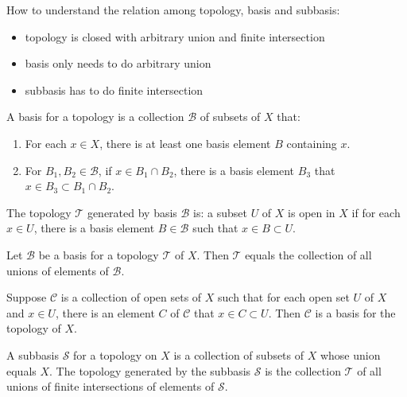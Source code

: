 How to understand the relation among topology, basis and subbasis:
\begin{itemize}
    \item topology is closed with arbitrary union and finite intersection
    \item basis only needs to do arbitrary union
    \item subbasis has to do finite intersection
\end{itemize}



\begin{definition}
    A basis for a topology is a collection $\mathcal{B}$ of subsets of $X$ that:
    \begin{enumerate}
        \item For each $x \in X$, there is at least one basis element $B$ containing $x$.
        \item For $B_1, B_2 \in \mathcal{B}$, if $x \in B_1 \cap B_2$, there is a basis element $B_3$ that $x \in B_3 \subset B_1 \cap B_2$.
    \end{enumerate}
\end{definition}

The topology $\mathcal{T}$ generated by basis $\mathcal{B}$ is: a subset $U$ of $X$ is open in $X$ if for each $x \in U$, there is a basis element $B \in \mathcal{B}$ such that $x \in B \subset U$.




\begin{theorem}
    Let $\mathcal{B}$ be a basis for a topology $\mathcal{T}$ of $X$. Then $\mathcal{T}$ equals the collection of all unions of elements of $\mathcal{B}$.
\end{theorem}



\begin{theorem}
    Suppose $\mathcal{C}$ is a collection of open sets of $X$ such that for each open set $U$ of $X$ and $x \in U$, there is an element $C$ of $\mathcal{C}$ that $x \in C \subset U$. Then $\mathcal{C}$ is a basis for the topology of $X$.    
\end{theorem}


\begin{definition}
    A subbasis $\mathcal{S}$ for a topology on $X$ is a collection of subsets of $X$ whose union equals $X$. The topology generated by the subbasis $\mathcal{S}$ is the collection $\mathcal{T}$ of all unions of finite intersections of elements of $\mathcal{S}$.
\end{definition}


